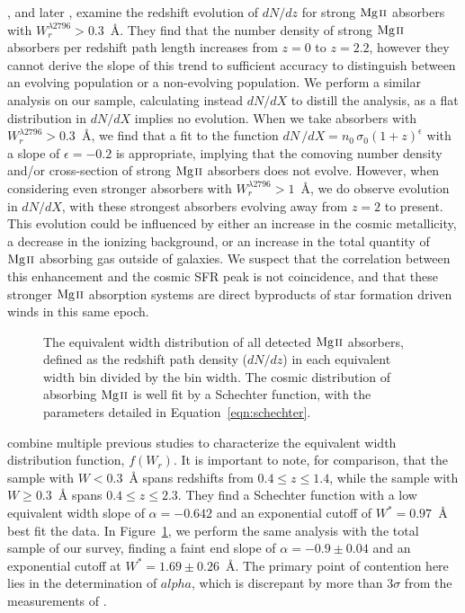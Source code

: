 \documentclass[iop,apj,numberedappendix,appendixfloats,twocolappendix]{emulateapj}
\begin{document}
\cite{Steidel1992}, and later \cite{Nestor2005}, examine the redshift evolution of $dN\!/dz$ for strong ${\hbox{{\rm Mg}\kern 0.1em{\sc ii}}}$ absorbers with $W_r^{\lambda2796} > 0.3$~{\AA}. They find that the number density of strong ${\hbox{{\rm Mg}\kern 0.1em{\sc ii}}}$ absorbers per redshift path length increases from $z = 0$ to $z = 2.2$, however they cannot derive the slope of this trend to sufficient accuracy to distinguish between an evolving population or a non-evolving population. We perform a similar analysis on our sample, calculating instead $dN\!/dX$ to distill the analysis, as a flat distribution in $dN\!/dX$ implies no evolution. When we take absorbers with $W_r^{\lambda2796} > 0.3$~{\AA}, we find that a fit to the function $dN\,/dX = n_0\,\sigma_0(1+z)^{\epsilon}$ with a slope of $\epsilon = -0.2$ is appropriate, implying that the comoving number density and/or cross-section of strong ${\hbox{{\rm Mg}\kern 0.1em{\sc ii}}}$ absorbers does not evolve. However, when considering even stronger absorbers with $W_r^{\lambda2796} > 1$~{\AA}, we do observe evolution in $dN\!/dX$, with these strongest absorbers evolving away from $z = 2$ to present. This evolution could be influenced by either an increase in the cosmic metallicity, a decrease in the ionizing background, or an increase in the total quantity of ${\hbox{{\rm Mg}\kern 0.1em{\sc ii}}}$ absorbing gas outside of galaxies. We suspect that the correlation between this enhancement and the cosmic SFR peak is not coincidence, and that these stronger ${\hbox{{\rm Mg}\kern 0.1em{\sc ii}}}$ absorption systems are direct byproducts of star formation driven winds in this same epoch. 

\begin{figure}[bth]
\caption{The equivalent width distribution of all detected ${\hbox{{\rm Mg}\kern 0.1em{\sc ii}}}$ absorbers, defined as the redshift path density ($dN\!/dz$) in each equivalent width bin divided by the bin width. The cosmic distribution of absorbing ${\hbox{{\rm Mg}\kern 0.1em{\sc ii}}}$ is well fit by a Schechter function, with the parameters detailed in Equation~\ref{eqn:schechter}.}
\label{fig:totalewdistro}
\end{figure}

\cite{Kacprzak2011MgII} combine multiple previous studies to characterize the equivalent width distribution function, $f(W_r)$. It is important to note, for comparison, that the sample with $W < 0.3$~{\AA} spans redshifts from $0.4 \le z \le 1.4$, while the sample with $W \ge 0.3$~{\AA} spans $0.4 \le z \le 2.3$. They find a Schechter function with a low equivalent width slope of $\alpha = -0.642$ and an exponential cutoff of $W^* = 0.97$~{\AA} best fit the data. In Figure~\ref{fig:totalewdistro}, we perform the same analysis with the total sample of our survey, finding a faint end slope of $\alpha = -0.9 \pm 0.04$ and an exponential cutoff at $W^* = 1.69 \pm 0.26$~{\AA}. The primary point of contention here lies in the determination of $alpha$, which is discrepant by more than $3\sigma$ from the measurements of \cite{Kacprzak2011MgII}. 
\end{document}
